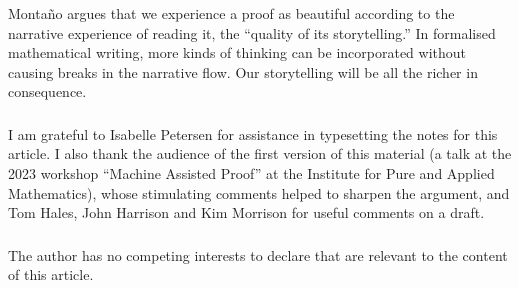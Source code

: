 \documentclass[12pt]{llncs}
\begin{document}
Monta\~no \cite{Mon12} argues that we experience a proof as beautiful according to the narrative experience of reading it,
the ``quality of its storytelling.''
In formalised mathematical writing,
more kinds of thinking can be incorporated without causing breaks in the narrative flow.
Our storytelling will be all the richer in consequence.

\begin{credits}
  \subsubsection{\ackname} I am grateful to Isabelle Petersen for assistance in typesetting the notes for this article.
  I also thank the audience of the first version of this material
  (a talk at the 2023 workshop ``Machine Assisted Proof'' at the Institute for Pure and Applied Mathematics),
  whose stimulating comments helped to sharpen the argument,
  and Tom Hales, John Harrison and Kim Morrison for useful comments on a draft.
  
  \subsubsection{\discintname}
  The author has no competing interests to declare that are
  relevant to the content of this article.
\end{credits}



\end{document}

